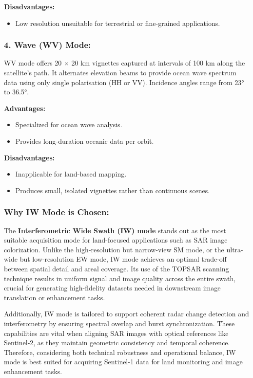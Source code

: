 \textbf{Disadvantages:}
\begin{itemize}
    \item Low resolution unsuitable for terrestrial or fine-grained applications.
\end{itemize}

\subsubsection{\textbf{4. Wave (WV) Mode: }}

WV mode offers 20 × 20 km vignettes captured at intervals of 100 km along the satellite's path. It alternates elevation beams to provide ocean wave spectrum data using only single polarisation (HH or VV). Incidence angles range from 23° to 36.5°.


\textbf{Advantages:}
\begin{itemize}
    \item Specialized for ocean wave analysis.
    \item Provides long-duration oceanic data per orbit.
\end{itemize}

\textbf{Disadvantages:}
\begin{itemize}
    \item Inapplicable for land-based mapping.
    \item Produces small, isolated vignettes rather than continuous scenes.
\end{itemize}

\subsubsection{\textbf{Why IW Mode is Chosen: }}

The \textbf{Interferometric Wide Swath (IW) mode} stands out as the most suitable acquisition mode for land-focused applications such as SAR image colorization. Unlike the high-resolution but narrow-view SM mode, or the ultra-wide but low-resolution EW mode, IW mode achieves an optimal trade-off between spatial detail and areal coverage. Its use of the TOPSAR scanning technique results in uniform signal and image quality across the entire swath, crucial for generating high-fidelity datasets needed in downstream image translation or enhancement tasks.

Additionally, IW mode is tailored to support coherent radar change detection and interferometry by ensuring spectral overlap and burst synchronization. These capabilities are vital when aligning SAR images with optical references like Sentinel‑2, as they maintain geometric consistency and temporal coherence. Therefore, considering both technical robustness and operational balance, IW mode is best suited for acquiring Sentinel-1 data for land monitoring and image enhancement tasks.



